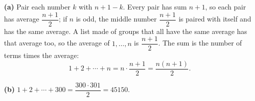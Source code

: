 \textbf{(a)} Pair each number $k$ with $n+1-k$. Every pair has sum $n+1$, so each pair has average $\dfrac{n+1}{2}$; if $n$ is odd, the middle number $\dfrac{n+1}{2}$ is paired with itself and has the same average. A list made of groups that all have the same average has that average too, so the average of $1,\dots,n$ is $\dfrac{n+1}{2}$. The sum is the number of terms times the average:
\[1+2+\cdots+n=n\cdot\dfrac{n+1}{2}=\dfrac{n(n+1)}{2}.\]

\textbf{(b)} $1+2+\cdots+300=\dfrac{300\cdot301}{2}=\boxed{45150}$.
